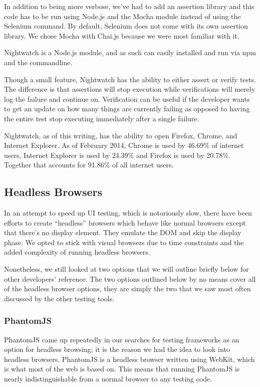 \documentclass[12pt]{ucthesis}
\begin{document}
In addition to being more verbose, we've had to add an assertion library and this code has to be run using Node.js and the Mocha module instead of using the Selenium command. By default, Selenium does not come with its own assertion library. We chose Mocha with Chai.js because we were most familiar with it.

Nightwatch is a Node.js module, and as such can easily installed and run via npm and the commandline.

Though a small feature, Nightwatch has the ability to either assert or verify tests. The difference is that assertions will stop execution while verifications will merely log the failure and continue on. Verification can be useful if the developer wants to get an update on how many things are currently failing as opposed to having the entire test stop executing immediately after a single failure.

Nightwatch, as of this writing, has the ability to open Firefox, Chrome, and Internet Explorer. As of February 2014, Chrome is used by 46.69\% of internet users, Internet Explorer is used by 24.39\% and Firefox is used by 20.78\%\cite{BrowserStats}. Together that accounts for 91.86\% of all internet users.

\subsection{Headless Browsers}
In an attempt to speed up UI testing, which is notoriously slow, there have been efforts to create ``headless'' browsers which behave like normal browsers except that there's no display element. They emulate the DOM and skip the display phase. We opted to stick with visual browsers due to time constraints and the added complexity of running headless browsers.

Nonetheless, we still looked at two options that we will outline briefly below for other developers' reference. The two options outlined below by no means cover all of the headless browser options, they are simply the two that we saw most often discussed by the other testing tools.

\subsubsection{PhantomJS}
PhantomJS\cite{PhantomJS} came up repeatedly in our searches for testing frameworks as an option for headless browsing; it is the reason we had the idea to look into headless browsers. PhantomJS is a headless browser written using WebKit, which is what most of the web is based on. This means that running PhantomJS is nearly indistinguishable from a normal browser to any testing code.
\end{document}
